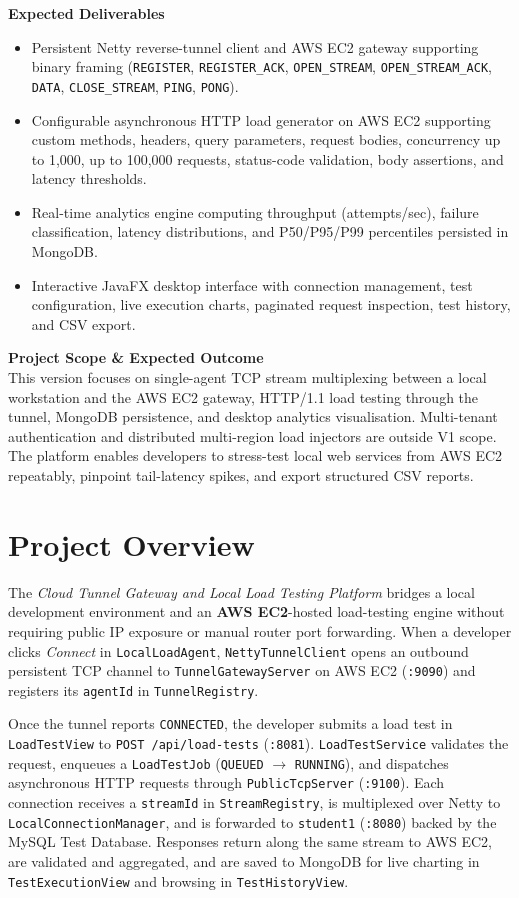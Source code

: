 \documentclass[11pt,a4paper]{report}
\begin{document}
\textbf{Expected Deliverables}
\begin{itemize}
  \item Persistent Netty reverse-tunnel client and AWS EC2 gateway supporting binary framing (\texttt{REGISTER}, \texttt{REGISTER\_ACK}, \texttt{OPEN\_STREAM}, \texttt{OPEN\_STREAM\_ACK}, \texttt{DATA}, \texttt{CLOSE\_STREAM}, \texttt{PING}, \texttt{PONG}).
  \item Configurable asynchronous HTTP load generator on AWS EC2 supporting custom methods, headers, query parameters, request bodies, concurrency up to 1,000, up to 100,000 requests, status-code validation, body assertions, and latency thresholds.
  \item Real-time analytics engine computing throughput (attempts/sec), failure classification, latency distributions, and P50/P95/P99 percentiles persisted in MongoDB.
  \item Interactive JavaFX desktop interface with connection management, test configuration, live execution charts, paginated request inspection, test history, and CSV export.
\end{itemize}

\textbf{Project Scope \& Expected Outcome}\\
This version focuses on single-agent TCP stream multiplexing between a local workstation and the AWS EC2 gateway, HTTP/1.1 load testing through the tunnel, MongoDB persistence, and desktop analytics visualisation. Multi-tenant authentication and distributed multi-region load injectors are outside V1 scope. The platform enables developers to stress-test local web services from AWS EC2 repeatably, pinpoint tail-latency spikes, and export structured CSV reports.

\section{Project Overview}

The \textit{Cloud Tunnel Gateway and Local Load Testing Platform} bridges a local development environment and an \textbf{AWS EC2}-hosted load-testing engine without requiring public IP exposure or manual router port forwarding. When a developer clicks \textit{Connect} in \texttt{LocalLoadAgent}, \texttt{NettyTunnelClient} opens an outbound persistent TCP channel to \texttt{TunnelGatewayServer} on AWS EC2 (\texttt{:9090}) and registers its \texttt{agentId} in \texttt{TunnelRegistry}.

Once the tunnel reports \texttt{CONNECTED}, the developer submits a load test in \texttt{LoadTestView} to \texttt{POST /api/load-tests} (\texttt{:8081}). \texttt{LoadTestService} validates the request, enqueues a \texttt{LoadTestJob} (\texttt{QUEUED} $\to$ \texttt{RUNNING}), and dispatches asynchronous HTTP requests through \texttt{PublicTcpServer} (\texttt{:9100}). Each connection receives a \texttt{streamId} in \texttt{StreamRegistry}, is multiplexed over Netty to \texttt{LocalConnectionManager}, and is forwarded to \texttt{student1} (\texttt{:8080}) backed by the MySQL Test Database. Responses return along the same stream to AWS EC2, are validated and aggregated, and are saved to MongoDB for live charting in \texttt{TestExecutionView} and browsing in \texttt{TestHistoryView}.
\end{document}
